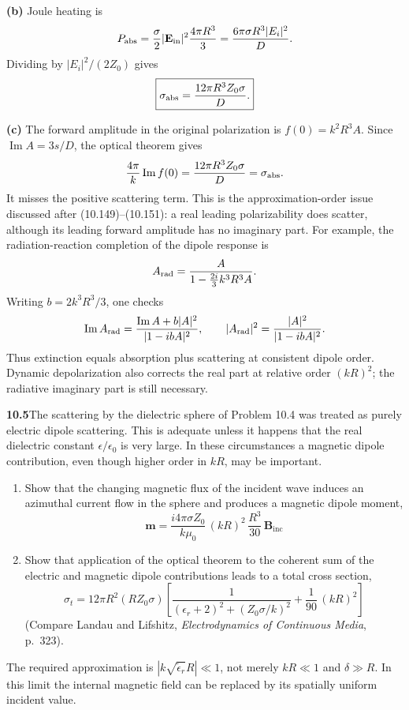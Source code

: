 \textbf{(b)} Joule heating is
\[
P_{\rm abs}=\frac{\sigma}{2}|\mathbf E_{\rm in}|^2
\frac{4\pi R^3}{3}
=\frac{6\pi\sigma R^3|E_i|^2}{D}.
\]
Dividing by $|E_i|^2/(2Z_0)$ gives
\[
\boxed{\sigma_{\rm abs}=\frac{12\pi R^3Z_0\sigma}{D}.}
\]

\textbf{(c)} The forward amplitude in the original polarization is
$f(0)=k^2R^3 A$. Since $\operatorname{Im}A=3s/D$, the optical theorem gives
\[
\frac{4\pi}{k}\operatorname{Im} f(0)
=\frac{12\pi R^3Z_0\sigma}{D}=\sigma_{\rm abs}.
\]
It misses the positive scattering term. This is the approximation-order
issue discussed after (10.149)--(10.151): a real leading polarizability
does scatter, although its leading forward amplitude has no imaginary part.
For example, the radiation-reaction completion of the dipole response is
\[
A_{\rm rad}=\frac{A}{1-\frac{2i}{3}k^3R^3 A}.
\]
Writing $b=2k^3R^3/3$, one checks
\[
\operatorname{Im}A_{\rm rad}
=\frac{\operatorname{Im}A+b|A|^2}{|1-ibA|^2},\qquad
|A_{\rm rad}|^2=\frac{|A|^2}{|1-ibA|^2}.
\]
Thus extinction equals absorption plus scattering at consistent dipole
order. Dynamic depolarization also corrects the real part at relative
order $(kR)^2$; the radiative imaginary part is still necessary.

\par\bigskip
\noindent\textbf{10.5}\quad The scattering by the dielectric sphere of Problem 10.4 was treated as purely electric dipole scattering. This is adequate unless it happens that the real dielectric constant $\epsilon/\epsilon_{0}$ is very large. In these circumstances a magnetic dipole contribution, even though higher order in $kR$, may be important. 
\begin{enumerate}
\item[(a)] Show that the changing magnetic flux of the incident wave induces an azimuthal current flow in the sphere and produces a magnetic dipole moment,
\[
\mathbf{m}=\frac{i4\pi\sigma Z_{0}}{k\mu_{0}}\,(kR)^{2}\,\frac{R^{3}}{30}\,\mathbf{B}_{\mathrm{inc}}
\]
\item[(b)] Show that application of the optical theorem to the coherent sum of the electric and magnetic dipole contributions leads to a total cross section,
\[
\sigma_{t}=12\pi R^{2}(RZ_{0}\sigma)\!\left[\frac{1}{(\epsilon_{r}+2)^{2}+(Z_{0}\sigma/k)^{2}}+\frac{1}{90}\,(kR)^{2}\right]
\]
(Compare Landau and Lifshitz, \emph{Electrodynamics of Continuous Media}, p.~323).
\end{enumerate}
\solution
The required approximation is $|k\sqrt{\widetilde\epsilon_r}R|\ll1$,
not merely $kR\ll1$ and $\delta\gg R$. In this limit the internal magnetic
field can be replaced by its spatially uniform incident value.

